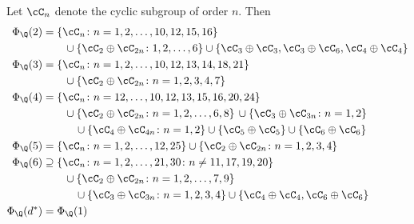 \begin{frame}[plain]
\begin{thm}
Let $\cC_n$ denote the cyclic subgroup of order $n$. Then 
	\[
	\begin{aligned}
	\Phi_\Q(2)&= \{ \cC_n \colon n= 1,2,\ldots,10,12,15,16\} \\
			&\quad\quad\cup \{ \cC_2 \oplus \cC_{2n} \colon 1,2,\ldots,6\} \cup \{ \cC_3 \oplus \cC_3, \cC_3 \oplus \cC_6, \cC_4 \oplus \cC_4 \} \\
	\Phi_\Q(3)&= \{ \cC_n \colon n=1,2,\ldots,10,12,13,14,18,21 \} \\
			&\quad\quad\cup \{ \cC_2 \oplus \cC_{2n} \colon n=1,2,3,4,7 \} \\
	\Phi_\Q(4)&= \{ \cC_n \colon n=12,\ldots,10,12,13,15,16,20,24 \} \\
			&\quad\quad\cup \{ \cC_2 \oplus \cC_{2n} \colon n=1,2,\ldots,6,8\} \, \cup \{ \cC_3 \oplus \cC_{3n} \colon n=1,2 \} \\
			&\quad\quad\quad\cup \{ \cC_4 \oplus \cC_{4n} \colon n=1,2 \} \cup \{ \cC_5 \oplus \cC_5 \} \cup \{ \cC_6 \oplus \cC_6 \}	\\
	\Phi_\Q(5)&= \{ \cC_n \colon n=1,2,\ldots,12,25\} \cup \{ \cC_2 \oplus \cC_{2n} \colon n=1,2,3,4\} \\
	\Phi_\Q(6)&\supseteq \{ \cC_n \colon n=1,2,\ldots,21,30 \colon n \neq 11,17,19,20\} \\
			&\quad\quad\cup \{ \cC_2 \oplus \cC_{2n} \colon n=1,2,\ldots,7,9 \} \\
			&\quad\quad\quad\cup \{ \cC_3 \oplus \cC_{3n} \colon n=1,2,3,4\} \cup \{ \cC_4 \oplus \cC_4, \cC_6 \oplus \cC_6 \} \\
	\Phi_\Q(d^*)&= \Phi_\Q(1)
	\end{aligned}
	\]
\end{thm}
\end{frame}


